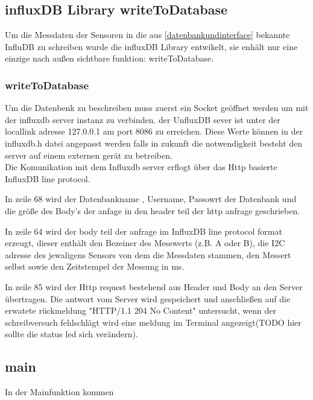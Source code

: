 \subsection{influxDB Library writeToDatabase}
Um die Messdaten der Sensoren in die aus \ref{datenbankundinterface} bekannte InfluDB zu schreiben wurde die influxDB Library entwikelt, sie enhält nur eine einzige nach außen sichtbare funktion: writeToDatabase.
\subsubsection{writeToDatabase}
Um die Datenbenk zu beschreiben muss zuerst ein Socket geöffnet werden um mit der influxdb server instanz zu verbinden.
der UnfluxDB sever ist unter der locallink adresse 127.0.0.1 am port 8086 zu erreichen.
	Diese Werte können in der influxdb.h datei angepasst werden falls in zukunft die notwendigkeit besteht den server auf einem externen gerät zu betreiben.\\
	Die Komunikation mit dem Influxdb server erflogt über das Http basierte InfluxDB line protocol.

	
	In zeile 68 wird der Datenbankname , Username,  Passowrt der Datenbank und die größe des Body's der anfage in den header teil der http anfrage geschrieben.
	
	In zeile 64 wird der body teil der anfrage im InfluxDB line protocol format erzeugt, dieser enthält den Bezeiner des Messwerts (z.B. A oder B), die I2C adresse des jewaligens Sensors von dem die Messdaten stammen, den Messert selbst sowie den Zeitstempel der Messung in ms.
	
In zeile 85 wird der Http request bestehend aus Header und Body an den Server übertragen.
Die antwort vom Server wird gespeichert und anschließen auf die erwatete rückmeldung "HTTP/1.1 204 No Content" untersucht, wenn der schreibversuch fehlschlägt wird eine meldung im Terminal angezeigt(TODO hier sollte die status led sich verändern).
\subsection{main}
In der Mainfunktion kommen 



